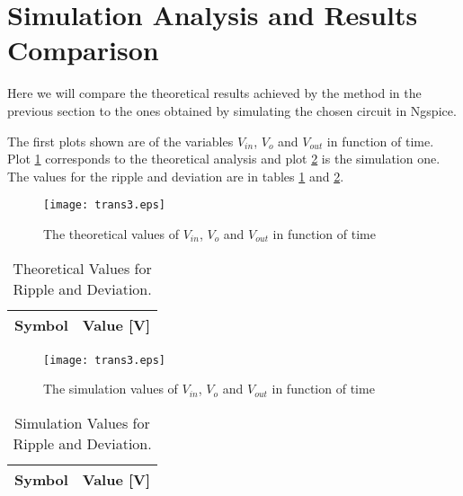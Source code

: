 \newpage
\section{Simulation Analysis and Results Comparison}
\label{sec:simulation}

Here we will compare the theoretical results achieved by the method in the previous section to the ones obtained by simulating the chosen circuit in Ngspice. 

The first plots shown are of the variables $V_{in}$, $V_{o}$ and $V_{out}$ in function of time. Plot \ref{fig:gteo1} corresponds to the theoretical analysis and plot \ref{fig:gsim1} is the simulation one. The values for the ripple and deviation are in tables \ref{tab:tteo1} and \ref{tab:tsim1}.


\begin{figure}[!ht] \centering
\caption{The theoretical values of $V_{in}$, $V_{o}$ and $V_{out}$ in function of time}
\texttt{[image: trans3.eps]}
\label{fig:gteo1}
\end{figure}
\newpage

\begin{table}[h]
    \centering
    \begin{tabular}{|l|c|}
    \hline
    {\bf Symbol} & {\bf Value [V]} \\ \hline
     
    \end{tabular}
    \caption{Theoretical Values for Ripple and Deviation.}
    \label{tab:tteo1}
\end{table}

\begin{figure}[!ht] \centering
\caption{The simulation values of $V_{in}$, $V_{o}$ and $V_{out}$ in function of time}
\texttt{[image: trans3.eps]}
\label{fig:gsim1}
\end{figure}
\newpage

\begin{table}[h]
    \centering
    \begin{tabular}{|l|c|}
    \hline
    {\bf Symbol} & {\bf Value [V]} \\ \hline
     
    \end{tabular}
    \caption{Simulation Values for Ripple and Deviation.}
    \label{tab:tsim1}
\end{table}







